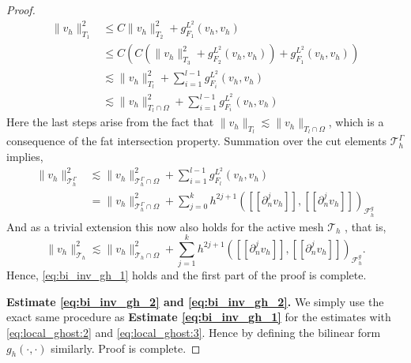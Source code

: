 \documentclass[11pt]{article}
\theoremstyle{remark}
\newcommand{\jump}[1]{\left[\!\left[ #1 \right]\!\right]}
\renewcommand{\le}{\leqslant}
\numberwithin{equation}{section}
\begin{document}
\begin{proof}
    \begin{align}
            \| v_{h} \|_{ T_{1} }^{2  }  & \le  C \| v_{h} \|_{ T_{2} }^{ 2 } + g_{F_{1}}^{L^{2}}( v_{h},v_{h})\\
              & \le  C( C( \| v_{h} \|_{ T_{3} }^{ 2 } + g_{F_{2}}^{L^{2}}( v_{h},v_{h}) ) + g_{F_{1}}^{L^{2}}( v_{h},v_{h}) )\\
              & \lesssim    \| v_{h} \|_{ T_{l} }^{ 2 }  + \sum_{i=1}^{l-1} g_{F_{i}}^{L^{2}}( v_{h},v_{h})  \\
              & \lesssim    \| v_{h} \|_{ T_{l} \cap \Omega  }^{ 2 }  + \sum_{i=1}^{l-1} g_{F_{i}}^{L^{2}}( v_{h},v_{h})
    \end{align}
            Here the last steps arise from the fact that $\|  v_{h} \|_{ T_{l} }^{  } \lesssim  \|  v_{h} \|_{ T_{l} \cap \Omega  }^{  }  $, which is a consequence of the fat intersection property.
            Summation over the cut elements $\mathcal{T} ^{\Gamma }_{h}$ implies,
            \begin{align}
                    \| v_{h} \|_{ \mathcal{T} ^{\Gamma }_h }^{2  } & \lesssim \| v_{h} \|_{ \mathcal{T} ^{\Gamma }_h\cap \Omega  }^{2  }+ \sum_{i=1}^{l-1} g_{F_{l}}^{L^{2}}( v_{h},v_{h}) \\
                                                                 & = \| v_{h} \|_{ \mathcal{T}^{\Gamma }_h \cap \Omega   }^{ 2 }  + \sum_{j=0}^{k} h^{2j+1} ( \jump{ \partial ^{j}_{n} v_{h} }, \jump{ \partial ^{j}_{n}v_{h} }    )_{\mathcal{F}_{h}^{g}}
            \end{align}
        And as a trivial extension this now also holds for the active mesh $\mathcal{T} _{h}$ , that is,
        \begin{equation}
                    \| v_{h} \|_{ \mathcal{T} _{h } }^{2  } \lesssim  \| v_{h} \|_{ \mathcal{T}_{h } \cap \Omega   }^{ 2 }  + \sum_{j=1}^{k} h^{2j+1} ( \jump{ \partial ^{j}_{n} v_{h} }, \jump{ \partial ^{j}_{n}v_{h} }    )_{\mathcal{F}_{h}^{g}}.
        \end{equation}
        Hence, \eqref{eq:bi_inv_gh_1} holds and the first part of the proof is complete.

        \textbf{Estimate \eqref{eq:bi_inv_gh_2} and \eqref{eq:bi_inv_gh_2}.}
        We simply use the exact same procedure as \textbf{Estimate \eqref{eq:bi_inv_gh_1}}  for the estimates with \eqref{eq:local_ghost:2}  and \eqref{eq:local_ghost:3}. Hence by defining the bilinear form $g_{h}( \cdot ,\cdot ) $ similarly. Proof is complete.
    \end{proof}
\end{document}
